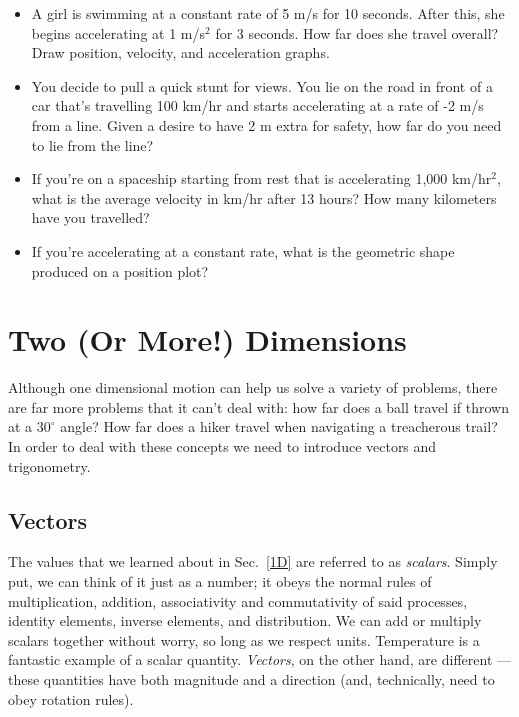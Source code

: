 \documentclass[letterpaper,12pt]{article}
\begin{document}
\begin{itemize}
\item A girl is swimming at a constant rate of 5 m/s for 10 seconds. After this, she begins accelerating at 1 m/s$^2$ for 3 seconds. How far does she travel overall? Draw position, velocity, and acceleration graphs. 

\item You decide to pull a quick stunt for views. You lie on the road in front of a car that's travelling 100 km/hr and starts accelerating at a rate of -2 m/s from a line. Given a desire to have 2 m extra for safety, how far do you need to lie from the line?

\item If you're on a spaceship starting from rest that is accelerating 1,000 km/hr$^2$, what is the average velocity in km/hr after 13 hours? How many kilometers have you travelled?

\item If you're accelerating at a constant rate, what is the geometric shape produced on a position plot?
\end{itemize}

\section{Two (Or More!) Dimensions}\label{2D}

Although one dimensional motion can help us solve a variety of problems, there are far more problems that it can't deal with: how far does a ball travel if thrown at a $30^{\circ}$ angle? How far does a hiker travel when navigating a treacherous trail? In order to deal with these concepts we need to introduce vectors and trigonometry. 

\subsection{Vectors}\label{sec:vectors}

The values that we learned about in Sec.~\ref{1D} are referred to as \textit{scalars}. Simply put, we can think of it just as a number; it obeys the normal rules of multiplication, addition, associativity and commutativity of said processes, identity elements, inverse elements, and distribution. We can add or multiply scalars together without worry, so long as we respect units. Temperature is a fantastic example of a scalar quantity. \textit{Vectors}, on the other hand, are different --- these quantities have both magnitude and a direction (and, technically, need to obey rotation rules). 
\end{document}

